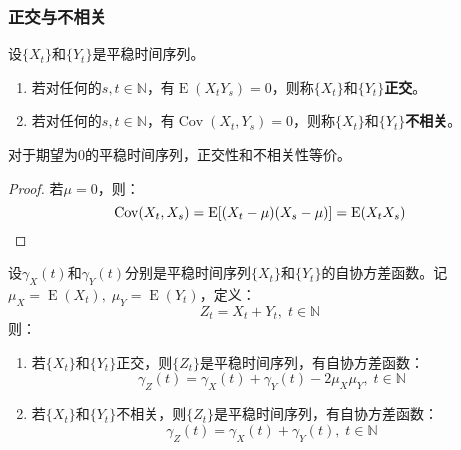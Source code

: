 \subsubsection{正交与不相关}
\begin{definition}
	设$\{X_t\}$和$\{Y_t\}$是平稳时间序列。
	\begin{enumerate}
		\item 若对任何的$s,t\in\mathbb{N}$，有$\operatorname{E}(X_tY_s)=0$，则称$\{X_t\}$和$\{Y_t\}$\textbf{正交}。
		\item 若对任何的$s,t\in\mathbb{N}$，有$\operatorname{Cov}(X_t,Y_s)=0$，则称$\{X_t\}$和$\{Y_t\}$\textbf{不相关}。
	\end{enumerate}
\end{definition}
\begin{theorem}\label{theo:StationarySeriesOrthogonalUncorrelated}
	对于期望为$0$的平稳时间序列，正交性和不相关性等价。
\end{theorem}
\begin{proof}
	若$\mu=0$，则：
	\begin{equation*}
		\operatorname{Cov}(X_t,X_s)=\operatorname{E}[(X_t-\mu)(X_s-\mu)]=\operatorname{E}(X_tX_s)\qedhere
	\end{equation*}
\end{proof}
\begin{theorem}\label{theo:StationarySeriesSum}
	设$\gamma_X(t)$和$\gamma_Y(t)$分别是平稳时间序列$\{X_t\}$和$\{Y_t\}$的自协方差函数。记$\mu_X=\operatorname{E}(X_t),\;\mu_Y=\operatorname{E}(Y_t)$，定义：
	\begin{equation*}
		Z_t=X_t+Y_t,\;t\in\mathbb{N}
	\end{equation*}
	则：
	\begin{enumerate}
		\item 若$\{X_t\}$和$\{Y_t\}$正交，则$\{Z_t\}$是平稳时间序列，有自协方差函数：
		\begin{equation*}
			\gamma_Z(t)=\gamma_X(t)+\gamma_Y(t)-2\mu_X\mu_Y,\;t\in\mathbb{N}
		\end{equation*}
		\item 若$\{X_t\}$和$\{Y_t\}$不相关，则$\{Z_t\}$是平稳时间序列，有自协方差函数：
		\begin{equation*}
			\gamma_Z(t)=\gamma_X(t)+\gamma_Y(t),\;t\in\mathbb{N}
		\end{equation*}
	\end{enumerate}
\end{theorem}
